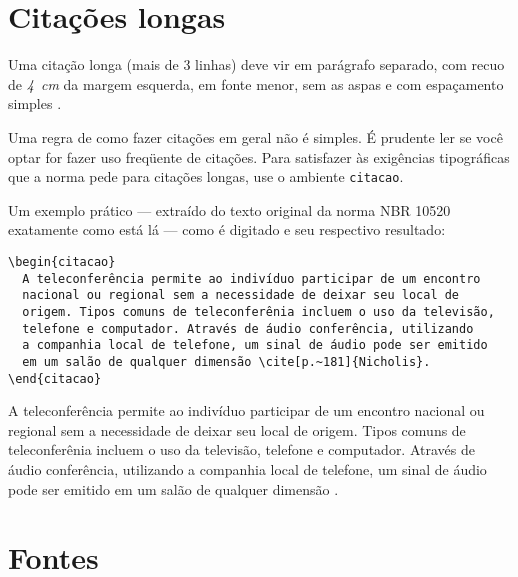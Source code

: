 \documentclass[espaco=simples,appendix=Name]{abnt}
\newcommand{\bs}{\symbol{92}}   %
\begin{document}



\section{Citações longas}\label{subsec: citacoes longas}

Uma citação longa (mais de 3 linhas) deve vir em parágrafo separado, com
recuo de \emph{4~cm} da margem esquerda, em fonte menor, sem as aspas
\cite[4.4]{NBR10520:2001} e com espaçamento simples
\cite[5.3]{NBR14724:2001}. 

Uma regra de como fazer citações em geral não é simples. É prudente ler
\cite{NBR10520:2001} se você optar for fazer uso freqüente de
citações. Para satisfazer às exigências tipográficas que a norma pede para
citações longas, use o ambiente \texttt{citacao}.

Um exemplo prático --- extraído do texto original da norma NBR 10520
exatamente como está lá --- como é digitado e seu respectivo resultado: 

\begin{verbatim}
\begin{citacao}
  A teleconferência permite ao indivíduo participar de um encontro
  nacional ou regional sem a necessidade de deixar seu local de
  origem. Tipos comuns de teleconferênia incluem o uso da televisão,
  telefone e computador. Através de áudio conferência, utilizando
  a companhia local de telefone, um sinal de áudio pode ser emitido
  em um salão de qualquer dimensão \cite[p.~181]{Nicholis}.
\end{citacao}
\end{verbatim}

\begin{citacao}
A teleconferência permite ao indivíduo participar de um encontro nacional
ou regional sem a necessidade de deixar seu local de origem. Tipos comuns
de teleconferênia incluem o uso da televisão, telefone e
computador. Através de áudio conferência, utilizando a companhia local de 
telefone, um sinal de áudio pode ser emitido em um salão de qualquer
dimensão \cite[p.~181]{Nicholis}.
\end{citacao}

\section{Fontes} \label{subsec: fontes}
\end{document}
